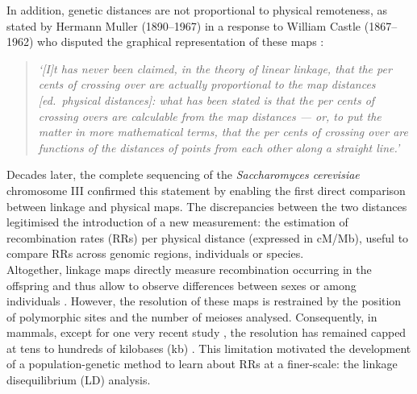 In addition, genetic distances are not proportional to physical remoteness, as stated by Hermann Muller (1890--1967) \citep{muller1920are} in a response to William Castle (1867--1962) who disputed the graphical representation of these maps \citep[reviewed in \citealp{vorms2013models}]{castle1919are,castle1919arrangement}:

\begin{quote}
\textit{‘[I]t has never been claimed, in the theory of linear linkage, that the per cents of crossing over are actually proportional to the map distances [ed.\ physical distances]:  what has been stated is that the per cents of crossing overs are calculable from the map distances — or, to put the matter in more mathematical terms, that the per cents of crossing over are functions of the distances of points from each other along a straight line.’}
\end{quote}


Decades later, the complete sequencing of the \textit{Saccharomyces cerevisiae} chromosome III \citep{oliver1992complete} confirmed this statement by enabling the first direct comparison between linkage and physical maps. 
The discrepancies between the two distances legitimised the introduction of a new measurement: the estimation of recombination rates (RRs) per physical distance (expressed in cM/Mb), useful to compare RRs across genomic regions, individuals or species.\\

Altogether, linkage maps directly measure recombination occurring in the offspring and thus allow to observe differences between sexes \citep[e.g.][]{cheung2007polymorphic,coop2008highresolution} or among individuals \citep[e.g.][]{broman1998comprehensive}.
However, the resolution of these maps is restrained by the position of polymorphic sites and the number of meioses analysed. 
Consequently, in mammals, except for one very recent study \citep{halldorsson2019characterizing}, the resolution has remained capped at tens to hundreds of kilobases (kb) \citep{shifman2006highresolution,billings2010patterns,kong2010finescale}.
This limitation motivated the development of a population-genetic method to learn about RRs at a finer-scale: the linkage disequilibrium (LD) analysis.



